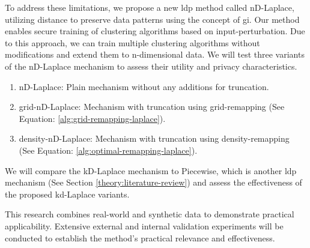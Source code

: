 To address these limitations, we propose a new \gls{ldp} method called nD-Laplace, utilizing distance to preserve data patterns using the concept of \gls{gi}. \newline
Our method enables secure training of clustering algorithms based on input-perturbation.
Due to this approach, we can train multiple clustering algorithms without modifications and extend them to n-dimensional data.
We will test three variants of the nD-Laplace mechanism to assess their utility and privacy characteristics.
\begin{enumerate}
      \item nD-Laplace: Plain mechanism without any additions for truncation.
      \item grid-nD-Laplace: Mechanism with truncation using grid-remapping (See Equation: \ref{alg:grid-remapping-laplace}).
      \item density-nD-Laplace: Mechanism with truncation using density-remapping (See Equation: \ref{alg:optimal-remapping-laplace}).
\end{enumerate}
We will compare the kD-Laplace mechanism to Piecewise, which is another \gls{ldp} mechanism (See Section \ref{theory:literature-review}) and assess the effectiveness of the proposed kd-Laplace variants.

This research combines real-world and synthetic data to demonstrate practical applicability.
Extensive external and internal validation experiments will be conducted to establish the method's practical relevance and effectiveness.


